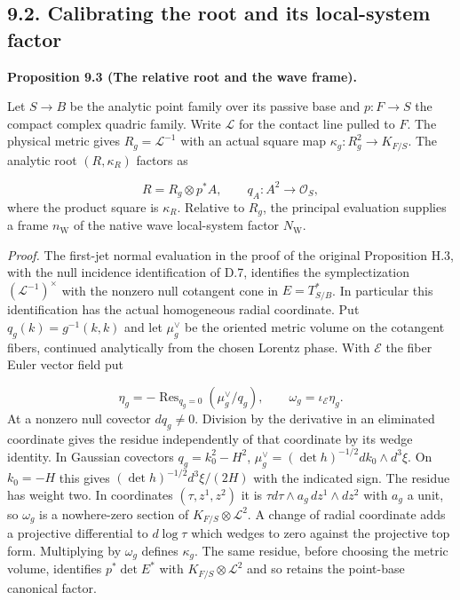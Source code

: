 \documentclass[
  english,
  11pt,
  reqno]{amsart}
\makeatletter
\newcommand{\pandocstatementheading}[1]{%
  \par\addpenalty{\@beginparpenalty}%
  \addvspace{.5\baselineskip plus .2\baselineskip minus .2\baselineskip}%
  {\normalfont\bfseries #1\par}%
  \nobreak\@afterindenttrue\@afterheading
}
\makeatother
\begin{document}
\subsection{9.2. Calibrating the root and its local-system
factor}\label{calibrating-the-root-and-its-local-system-factor}\label{sec:analytic-framing}

\pandocstatementheading{\leavevmode{}\label{prop:relative-residue-calibration}Proposition 9.3 (The relative root and the wave frame).}

Let \(S\to B\) be the analytic point family over its passive base and
\(p:F\to S\) the compact complex quadric family. Write \(\mathcal L\)
for the contact line pulled to \(F\). The physical metric gives
\(R_g=\mathcal L^{-1}\) with an actual square map
\(\kappa_g:R_g^2\to K_{F/S}\). The analytic root \((R,\kappa_R)\)
factors as

\label{eq:relative-analytic-quadratic-line} \[
R=R_g\otimes p^*A,\qquad q_A:A^2\longrightarrow\mathcal O_S,
\] where the product square is \(\kappa_R\). Relative to \(R_g\), the
principal evaluation supplies a frame \(n_{\mathrm W}\) of the native
wave local-system factor \(N_{\mathrm W}\).

\emph{Proof.} The first-jet normal evaluation in the proof of the
original Proposition H.3, with the null incidence identification of D.7,
identifies the symplectization \((\mathcal L^{-1})^\times\) with the
nonzero null cotangent cone in \(E=T^*_{S/B}\). In particular this
identification has the actual homogeneous radial coordinate. Put
\(q_g(k)=g^{-1}(k,k)\) and let \(\mu_g^\vee\) be the oriented metric
volume on the cotangent fibers, continued analytically from the chosen
Lorentz phase. With \(\mathscr E\) the fiber Euler vector field put

\label{eq:relative-analytic-null-residue} \[
\eta_g=-\operatorname{Res}_{q_g=0}(\mu_g^\vee/q_g),\qquad
\omega_g=\iota_{\mathscr E}\eta_g .
\] At a nonzero null covector \(dq_g\ne0\). Division by the derivative
in an eliminated coordinate gives the residue independently of that
coordinate by its wedge identity. In Gaussian covectors
\(q_g=k_0^2-H^2\), \(\mu_g^\vee=(\det h)^{-1/2}dk_0\wedge d^3\xi\). On
\(k_0=-H\) this gives \((\det h)^{-1/2}d^3\xi/(2H)\) with the indicated
sign. The residue has weight two. In coordinates \((\tau,z^1,z^2)\) it
is \(\tau d\tau\wedge a_g\,dz^1\wedge dz^2\) with \(a_g\) a unit, so
\(\omega_g\) is a nowhere-zero section of
\(K_{F/S}\otimes\mathcal L^2\). A change of radial coordinate adds a
projective differential to \(d\log\tau\) which wedges to zero against
the projective top form. Multiplying by \(\omega_g\) defines
\(\kappa_g\). The same residue, before choosing the metric volume,
identifies \(p^*\det E^*\) with \(K_{F/S}\otimes\mathcal L^2\) and so
retains the point-base canonical factor.
\end{document}
